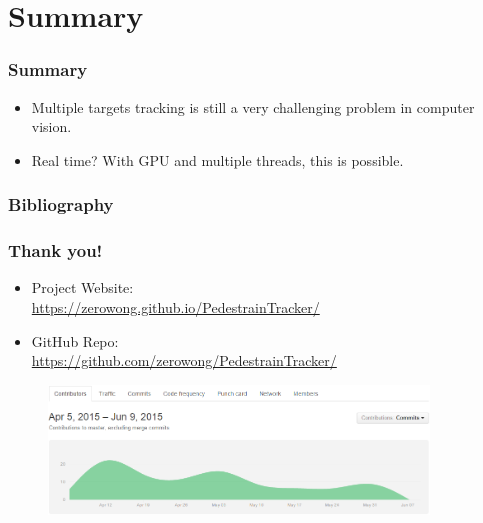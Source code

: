 \documentclass{beamer}
\begin{document}
\section{Summary}
\begin{frame}
	\frametitle{Summary}
	\begin{itemize}
		\item Multiple targets tracking is still a very challenging problem in computer vision.
		\item Real time? With GPU and multiple threads, this is possible.
	\end{itemize}
\end{frame}

\begin{frame}
	\frametitle{Bibliography}
    
    {\scriptsize}
\end{frame}

\begin{frame}
	\frametitle{Thank you!}
	\begin{itemize}
		\item Project Website:\\
		\href{https://zerowong.github.io/PedestrainCounting/}{https://zerowong.github.io/PedestrainTracker/}
		\item GitHub Repo:\\
		\href{https://github.com/zerowong/PedestrainCounting}{https://github.com/zerowong/PedestrainTracker/}
	\end{itemize}
	\begin{figure}
		\begin{center}
			\includegraphics[width=0.9\textwidth]{images/git.png}
		\end{center}
	\end{figure}
\end{frame}
\end{document}
